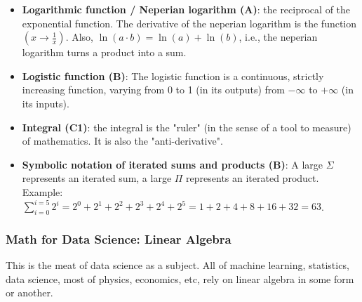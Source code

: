 \documentclass{article}
\begin{document}
\begin{itemize}
    \item \textbf{Logarithmic function / Neperian logarithm (A)}: the reciprocal of the exponential function. The derivative of the neperian logarithm is the function $(x \to \frac{1}{x})$. Also, $\ln(a \cdot b) = \ln(a) + \ln(b)$, i.e., the neperian logarithm turns a product into a sum.
    
    \item \textbf{Logistic function (B)}: The logistic function is a continuous, strictly increasing function, varying from 0 to 1 (in its outputs) from $-\infty$ to $+\infty$ (in its inputs).
    
    \item \textbf{Integral (C1)}: the integral is the "ruler" (in the sense of a tool to measure) of mathematics. It is also the "anti-derivative".
    
    \item \textbf{Symbolic notation of iterated sums and products (B)}: A large $\Sigma$ represents an iterated sum, a large $\Pi$ represents an iterated product. Example: $\sum_{i = 0}^{i = 5} 2^i = 2^0 + 2^1 + 2^2 + 2^3 + 2^4 + 2^5 = 1 + 2 + 4 + 8 + 16 + 32 = 63$.
\end{itemize}


\subsubsection*{Math for Data Science: Linear Algebra}

This is the meat of data science as a subject. All of machine learning, statistics, data science, most of physics, economics, etc, rely on linear algebra in some form or another.
\end{document}

